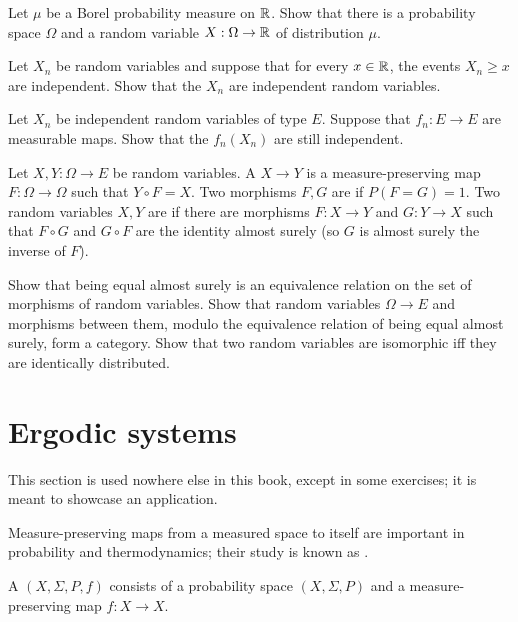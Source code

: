 \begin{exercise}\label{Skohorod representation}
Let $\mu$ be a Borel probability measure on $\mathbb{R}$.
Show that there is a probability space $\Omega$ and a random variable $X: \Omega \to \mathbb{R}$ of distribution $\mu$.
\end{exercise}

\begin{exercise}
Let $X_{n}$ be random variables and suppose that for every $x \in \mathbb{R}$, the events $X_{n} \geq x$ are independent.
Show that the $X_{n}$ are independent random variables.
\end{exercise}

\begin{exercise}
Let $X_{n}$ be independent random variables of type $E$.
Suppose that $f_{n}: E \to E$ are measurable maps.
Show that the $f_{n}(X_{n})$ are still independent.
\end{exercise}

\begin{exercise}
Let $X, Y: \Omega \to E$ be random variables.
A  $X \to Y$ is a measure-preserving map $F: \Omega \to \Omega$ such that $Y \circ F = X$.
Two morphisms $F,G$ are  if $P(F = G) = 1$.
Two random variables $X,Y$ are  if there are morphisms $F: X \to Y$ and $G: Y \to X$ such that $F \circ G$ and $G \circ F$ are the identity almost surely (so $G$ is almost surely the inverse of $F$).

Show that being equal almost surely is an equivalence relation on the set of morphisms of random variables.
Show that random variables $\Omega \to E$ and morphisms between them, modulo the equivalence relation of being equal almost surely, form a category.
Show that two random variables are isomorphic iff they are identically distributed.
\end{exercise}

\section{Ergodic systems}
This section is used nowhere else in this book, except in some exercises; it is meant to showcase an application.

Measure-preserving maps from a measured space to itself are important in probability and thermodynamics; their study is known as .

\begin{definition}
A  $(X, \Sigma, P, f)$ consists of a probability space $(X, \Sigma, P)$ and a measure-preserving map $f: X \to X$.
\end{definition}

